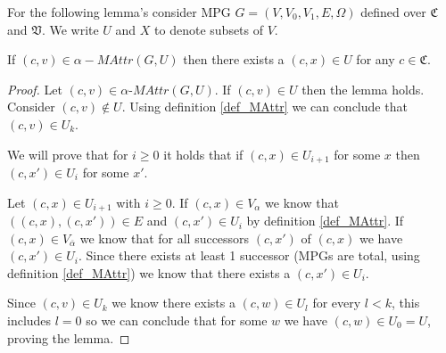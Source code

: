 
For the following lemma's consider MPG $G = (V,V_0,V_1,E,\Omega)$ defined over $\mathfrak{C}$ and $\mathfrak{V}$. We write $U$ and $X$ to denote subsets of $V$.
\begin{lemma}
	\label{lem_MPG_MAttr_conf_neutrality}
	If $(c,v) \in \alpha{-}MAttr(G, U)$ then there exists a $(c,x) \in U$ for any $c \in \mathfrak{C}$.
	\begin{proof}
		Let $(c,v) \in \alpha\textit{-MAttr}(G,U)$. If $(c,v) \in U$ then the lemma holds. Consider $(c,v) \notin U$. 	Using definition \ref{def_MAttr} we can conclude that $(c,v) \in U_k$. 
		
		We will prove that for $i \geq 0$ it holds that if $(c,x) \in U_{i+1}$ for some $x$ then $(c,x') \in U_i$ for some $x'$.
		
		Let $(c,x) \in U_{i+1}$ with $i \geq 0$. If $(c,x) \in V_\alpha$ we know that $((c,x),(c,x')) \in E$ and $(c,x') \in U_i$ by definition \ref{def_MAttr}. If $(c,x) \in V_{\overline{\alpha}}$ we know that for all successors $(c,x')$ of $(c,x)$ we have $(c,x') \in U_i$. Since there exists at least 1 successor (MPGs are total, using definition \ref{def_MAttr}) we know that there exists a $(c,x') \in U_i$.
		
		Since $(c,v) \in U_k$ we know there exists a $(c,w) \in U_l$ for every $l<k$, this includes $l=0$ so we can conclude that for some $w$ we have $(c,w) \in U_0 = U$, proving the lemma.
	\end{proof}
\end{lemma}

